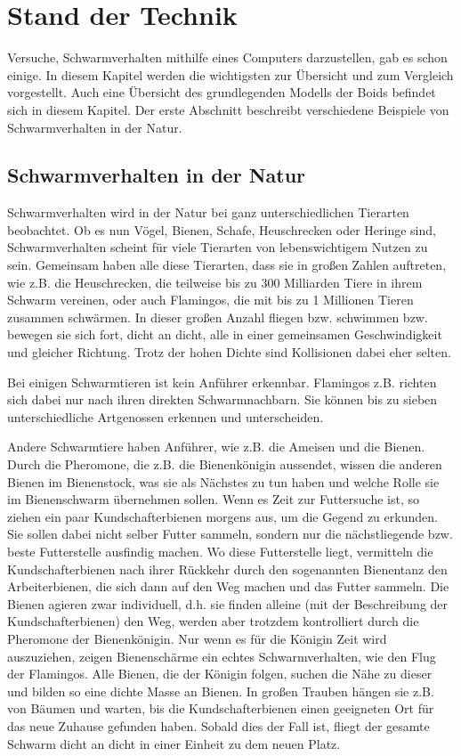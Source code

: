 \documentclass[draft=false
              ,paper=a4
              ,twoside=false
              ,fontsize=11pt
              ,headsepline
              ,BCOR10mm
              ,DIV11
              ,bibtotoc
              ,liststotoc
              ]{scrbook}
\begin{document}
\chapter{Stand der Technik}\label{stand}
Versuche, Schwarmverhalten mithilfe eines Computers darzustellen, gab es schon einige. In diesem Kapitel werden die wichtigsten zur Übersicht und zum Vergleich vorgestellt. Auch eine Übersicht des grundlegenden Modells der Boids befindet sich in diesem Kapitel. Der erste Abschnitt beschreibt verschiedene Beispiele von Schwarmverhalten in der Natur.
\section{Schwarmverhalten in der Natur}\label{natur}
Schwarmverhalten wird in der Natur bei ganz unterschiedlichen Tierarten beobachtet. Ob es nun Vögel, Bienen, Schafe, Heuschrecken oder Heringe sind, Schwarmverhalten scheint für viele Tierarten von lebenswichtigem Nutzen zu sein.
Gemeinsam haben alle diese Tierarten, dass sie in großen Zahlen auftreten, wie z.B. die Heuschrecken, die teilweise bis zu 300 Milliarden Tiere in ihrem Schwarm vereinen, oder auch Flamingos, die mit bis zu 1 Millionen Tieren zusammen schwärmen.
In dieser großen Anzahl fliegen bzw. schwimmen bzw. bewegen sie sich fort, dicht an dicht, alle in einer gemeinsamen Geschwindigkeit und gleicher Richtung. Trotz der hohen Dichte sind Kollisionen dabei eher selten.

Bei einigen Schwarmtieren ist kein Anführer erkennbar. Flamingos z.B. richten sich dabei nur nach ihren direkten Schwarmnachbarn. Sie können bis zu sieben unterschiedliche Artgenossen erkennen und unterscheiden.

Andere Schwarmtiere haben Anführer, wie z.B. die Ameisen und die Bienen. Durch die Pheromone, die z.B. die Bienenkönigin aussendet, wissen die anderen Bienen im Bienenstock, was sie als Nächstes zu tun haben und welche Rolle sie im Bienenschwarm übernehmen sollen. Wenn es Zeit zur Futtersuche ist, so ziehen ein paar Kundschafterbienen morgens aus, um die Gegend zu erkunden. Sie sollen dabei nicht selber Futter sammeln, sondern nur die nächstliegende bzw. beste Futterstelle ausfindig machen. Wo diese Futterstelle liegt, vermitteln die Kundschafterbienen nach ihrer Rückkehr durch den sogenannten Bienentanz den Arbeiterbienen, die sich dann auf den Weg machen und das Futter sammeln. Die Bienen agieren zwar individuell, d.h. sie finden alleine (mit der Beschreibung der Kundschafterbienen) den Weg, werden aber trotzdem kontrolliert durch die Pheromone der Bienenkönigin.
Nur wenn es für die Königin Zeit wird auszuziehen, zeigen Bienenschärme ein echtes Schwarmverhalten, wie den Flug der Flamingos. Alle Bienen, die der Königin folgen, suchen die Nähe zu dieser und bilden so eine dichte Masse an Bienen. In großen Trauben hängen sie z.B. von Bäumen und warten, bis die Kundschafterbienen einen geeigneten Ort für das neue Zuhause gefunden haben. Sobald dies der Fall ist, fliegt der gesamte Schwarm dicht an dicht in einer Einheit zu dem neuen Platz.
\end{document}
